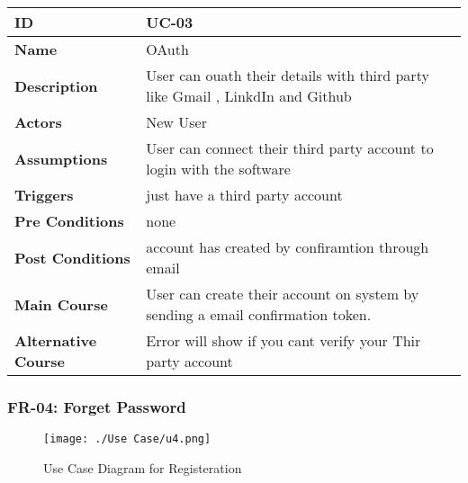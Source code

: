     \begin{center}
        \begin{tabularx}{\textwidth}{|l|X|}
            \hline
            \textbf{ID} & UC-03 \\
            \hline
            \textbf{Name} & OAuth \\
            \hline
            \textbf{Description} & User can ouath their details with third party like Gmail , LinkdIn and Github \\
            \hline
            \textbf{Actors} & New User \\
            \hline
            \textbf{Assumptions} & User can connect their third party account to login with the software \\
            \hline
            \textbf{Triggers} & just have a third party account  \\
            \hline
            \textbf{Pre Conditions} & none \\
            \hline
            \textbf{Post Conditions} & account has created by confiramtion through email  \\
            \hline
            \textbf{Main Course} & User can create their account on system by sending a email confirmation token. \\
            \hline
            \textbf{Alternative Course} & Error will show if you cant verify your Thir party account \\
            \hline
            
        \end{tabularx}
    \end{center}
    \newpage
    

    \subsubsection{FR-04: Forget Password}
    \begin{figure}[H]
        \texttt{[image: ./Use Case/u4.png]}
        \centering 
        \caption{Use Case Diagram for Registeration}
        \label{fig:prototype1}
        \end{figure}
        
